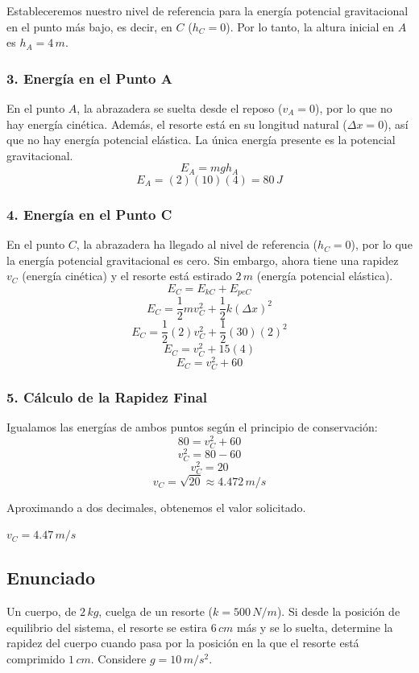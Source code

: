 \documentclass[12pt, a4paper]{article}
\begin{document}
Estableceremos nuestro nivel de referencia para la energía potencial gravitacional en el punto más bajo, es decir, en $C$ ($h_C = 0$). Por lo tanto, la altura inicial en $A$ es $h_A = 4 \, \si{m}$.

\subsubsection*{3. Energía en el Punto A}
En el punto $A$, la abrazadera se suelta desde el reposo ($v_A = 0$), por lo que no hay energía cinética. Además, el resorte está en su longitud natural ($\Delta x = 0$), así que no hay energía potencial elástica. La única energía presente es la potencial gravitacional.
$$ E_A = mgh_A $$
$$ E_A = (2)(10)(4) = 80 \, \si{J} $$

\subsubsection*{4. Energía en el Punto C}
En el punto $C$, la abrazadera ha llegado al nivel de referencia ($h_C = 0$), por lo que la energía potencial gravitacional es cero. Sin embargo, ahora tiene una rapidez $v_C$ (energía cinética) y el resorte está estirado $2 \, \si{m}$ (energía potencial elástica).
$$ E_C = E_{kC} + E_{peC} $$
$$ E_C = \frac{1}{2} m v_C^2 + \frac{1}{2} k (\Delta x)^2 $$
$$ E_C = \frac{1}{2} (2) v_C^2 + \frac{1}{2} (30) (2)^2 $$
$$ E_C = v_C^2 + 15 (4) $$
$$ E_C = v_C^2 + 60 $$

\subsubsection*{5. Cálculo de la Rapidez Final}
Igualamos las energías de ambos puntos según el principio de conservación:
$$ 80 = v_C^2 + 60 $$
$$ v_C^2 = 80 - 60 $$
$$ v_C^2 = 20 $$
$$ v_C = \sqrt{20} \approx 4.472 \, \si{m/s} $$

Aproximando a dos decimales, obtenemos el valor solicitado.

\begin{tcolorbox}[colback=green!5!white, colframe=green!50!black, title=Respuesta Final]
\centering \Large $v_C = 4.47 \, \si{m/s}$
\end{tcolorbox}

\newpage

\subsection*{Enunciado}
Un cuerpo, de $2 \, \si{kg}$, cuelga de un resorte ($k = 500 \, \si{N/m}$). Si desde la posición de equilibrio del sistema, el resorte se estira $6 \, \si{cm}$ más y se lo suelta, determine la rapidez del cuerpo cuando pasa por la posición en la que el resorte está comprimido $1 \, \si{cm}$. Considere $g = 10 \, \si{m/s^2}$.
\end{document}
